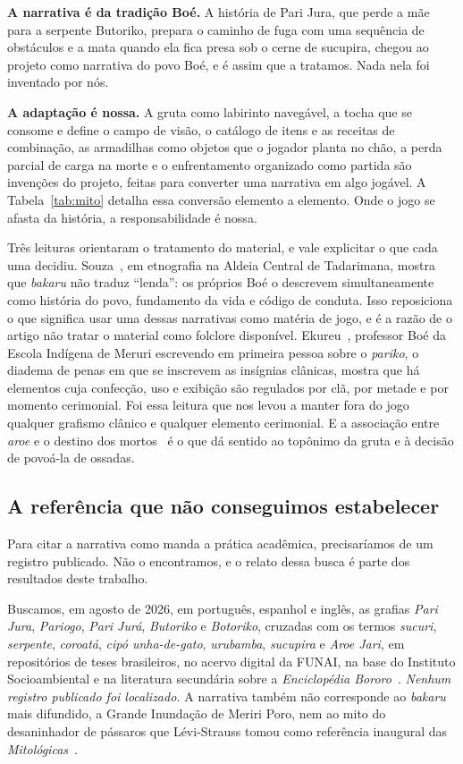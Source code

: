 \documentclass[conference]{IEEEtran}
\begin{document}
\textbf{A narrativa é da tradição Boé.} A história de Pari Jura, que perde a mãe para a
serpente Butoriko, prepara o caminho de fuga com uma sequência de obstáculos e a mata
quando ela fica presa sob o cerne de sucupira, chegou ao projeto como narrativa do povo
Boé, e é assim que a tratamos. Nada nela foi inventado por nós.

\textbf{A adaptação é nossa.} A gruta como labirinto navegável, a tocha que se consome e
define o campo de visão, o catálogo de itens e as receitas de combinação, as armadilhas
como objetos que o jogador planta no chão, a perda parcial de carga na morte e o
enfrentamento organizado como partida são invenções do projeto, feitas para converter uma
narrativa em algo jogável. A Tabela~\ref{tab:mito} detalha essa conversão elemento a
elemento. Onde o jogo se afasta da história, a responsabilidade é nossa.

Três leituras orientaram o tratamento do material, e vale explicitar o que cada uma
decidiu. Souza~\cite{souzabakaru,souza2014}, em etnografia na Aldeia Central de
Tadarimana, mostra que \textit{bakaru} não traduz ``lenda'': os próprios Boé o descrevem
simultaneamente como história do povo, fundamento da vida e código de conduta. Isso
reposiciona o que significa usar uma dessas narrativas como matéria de jogo, e é a razão
de o artigo não tratar o material como folclore disponível.
Ekureu~\cite{ekureu2025}, professor Boé da Escola Indígena de Meruri escrevendo em
primeira pessoa sobre o \textit{pariko}, o diadema de penas em que se inscrevem as
insígnias clânicas, mostra que há elementos cuja confecção, uso e exibição são regulados
por clã, por metade e por momento cerimonial. Foi essa leitura que nos levou a manter fora
do jogo qualquer grafismo clânico e qualquer elemento cerimonial. E a associação entre
\textit{aroe} e o destino dos mortos~\cite{serpa2025,crocker1985} é o que dá sentido ao
topônimo da gruta e à decisão de povoá-la de ossadas.

\subsection{A referência que não conseguimos estabelecer}
\label{sec:referencia}

Para citar a narrativa como manda a prática acadêmica, precisaríamos de um registro
publicado. Não o encontramos, e o relato dessa busca é parte dos resultados deste
trabalho.

Buscamos, em agosto de 2026, em português, espanhol e inglês, as grafias
\textit{Pari Jura}, \textit{Pariogo}, \textit{Pari Jurá}, \textit{Butoriko} e
\textit{Botoriko}, cruzadas com os termos \textit{sucuri}, \textit{serpente},
\textit{coroatá}, \textit{cipó unha-de-gato}, \textit{urubamba}, \textit{sucupira} e
\textit{Aroe Jari}, em repositórios de teses brasileiros, no acervo digital da FUNAI, na
base do Instituto Socioambiental e na literatura secundária sobre a \textit{Enciclopédia
Bororo}~\cite{albisetti1969}. \emph{Nenhum registro publicado foi localizado.} A narrativa
também não corresponde ao \textit{bakaru} mais difundido, a Grande Inundação de Meriri
Poro, nem ao mito do desaninhador de pássaros que Lévi-Strauss tomou como referência
inaugural das \textit{Mitológicas}~\cite{levistrauss1964}.
\end{document}
